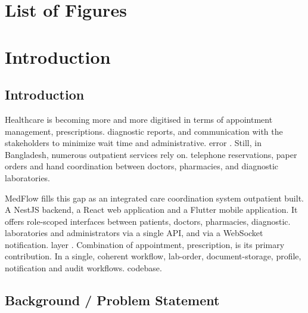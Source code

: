 \documentclass[12pt,a4paper]{report}
\begin{document}
\chapter*{List of Figures}
\thispagestyle{plain}
\noindent{}\par
\vspace{6pt}
\begingroup
\makeatletter
{}
\makeatother
\endgroup
\clearpage

\hypersetup{pageanchor=true}
\setcounter{page}{1}

\chapter{Introduction}
\label{chap:introduction}

\section{Introduction}

\setlength{\parskip}{6pt}

Healthcare is becoming more and more digitised in terms of appointment management, prescriptions.
diagnostic reports, and communication with the stakeholders to minimize wait time and administrative.
error \cite{r1,r2}. Still, in Bangladesh, numerous outpatient services rely on.
telephone reservations, paper orders and hand coordination between doctors,
pharmacies, and diagnostic laboratories.

MedFlow fills this gap as an integrated care coordination system outpatient built.
A NestJS backend, a React web application and a Flutter mobile application. It
offers role-scoped interfaces between patients, doctors, pharmacies, diagnostic.
laboratories and administrators via a single API, and via a WebSocket notification.
layer \cite{r3}. Combination of appointment, prescription, is its primary contribution.
In a single, coherent workflow, lab-order, document-storage, profile, notification and audit workflows.
codebase.
\section{Background / Problem Statement}
\end{document}
